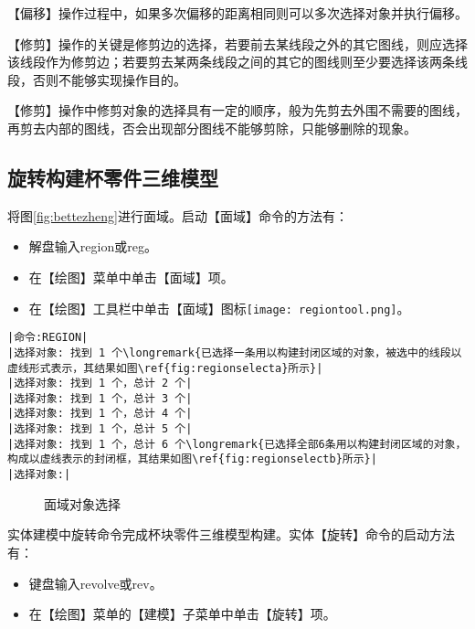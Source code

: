 \begin{tips}
\item 【偏移】操作过程中，如果多次偏移的距离相同则可以多次选择对象并执行偏移。
\item 【修剪】操作的关键是修剪边的选择，若要前去某线段之外的其它图线，则应选择该线段作为修剪边；若要剪去某两条线段之间的其它的图线则至少要选择该两条线段，否则不能够实现操作目的。
\item 【修剪】操作中修剪对象的选择具有一定的顺序，般为先剪去外围不需要的图线，再剪去内部的图线，否会出现部分图线不能够剪除，只能够删除的现象。
\end{tips}

\subsection{旋转构建杯零件三维模型}
\begin{procedure}
\item 将图\ref{fig:bettezheng}进行面域。启动【面域】命令的方法有：
\begin{itemize}
\item 解盘输入region或reg。
\item 在【绘图】菜单中单击【面域】项。
\item 在【绘图】工具栏中单击【面域】图标\texttt{[image: regiontool.png]}。
\end{itemize}
\begin{lstlisting}
|命令:REGION|
|选择对象: 找到 1 个\longremark{已选择一条用以构建封闭区域的对象，被选中的线段以虚线形式表示，其结果如图\ref{fig:regionselecta}所示}|
|选择对象: 找到 1 个，总计 2 个|
|选择对象: 找到 1 个，总计 3 个|
|选择对象: 找到 1 个，总计 4 个|
|选择对象: 找到 1 个，总计 5 个|
|选择对象: 找到 1 个，总计 6 个\longremark{已选择全部6条用以构建封闭区域的对象，构成以虚线表示的封闭框，其结果如图\ref{fig:regionselectb}所示}|
|选择对象:|
\end{lstlisting}
\showremarks
\begin{figure}[htbp]
\centering
{}\hspace{30pt}
\caption{面域对象选择}
\end{figure}
\item 实体建模中旋转命令完成杯块零件三维模型构建。实体【旋转】命令的启动方法有：
\begin{itemize}
\item 键盘输入revolve或rev。
\item 在【绘图】菜单的【建模】子菜单中单击【旋转】项。

\end{itemize}
\end{procedure}
